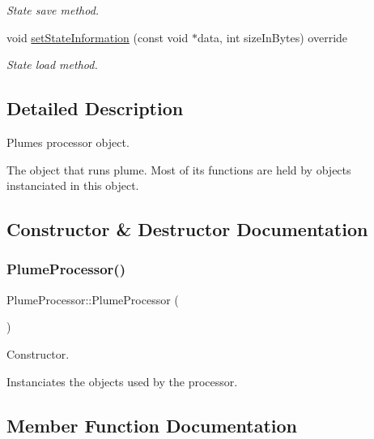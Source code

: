 \begin{DoxyCompactItemize}
\begin{DoxyCompactList}\small\item\em State save method. \end{DoxyCompactList}\item 
void \mbox{\hyperlink{class_plume_processor_aa7ab9da73c37f6db69ea6c7e1e4a0211}{set\+State\+Information}} (const void $\ast$data, int size\+In\+Bytes) override
\begin{DoxyCompactList}\small\item\em State load method. \end{DoxyCompactList}\end{DoxyCompactItemize}


\subsection{Detailed Description}
Plume\textquotesingle{}s processor object. 

The object that runs plume. Most of it\textquotesingle{}s functions are held by objects instanciated in this object. 

\subsection{Constructor \& Destructor Documentation}
\mbox{\label{class_plume_processor_a1462b7f98f4677da0dab2d98dd8da1e1}} 
\subsubsection{\texorpdfstring{Plume\+Processor()}{PlumeProcessor()}}
{\footnotesize\ttfamily Plume\+Processor\+::\+Plume\+Processor (\begin{DoxyParamCaption}{ }\end{DoxyParamCaption})}



Constructor. 

Instanciates the objects used by the processor. 

\subsection{Member Function Documentation}
\mbox{\label{class_plume_processor_ae06dd312c3dc3ba7389ce44fd74cbc18}} 
